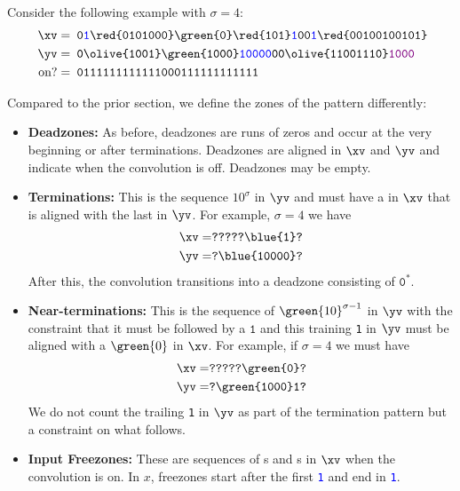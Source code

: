 Consider the following example with $\sigma = 4$:
\begin{align*}
  \xv=&\texttt{ 0\textcolor{blue}{1}\red{0101000}\green{0}\red{101}\textcolor{blue}{1}00\textcolor{blue}{1}\red{00100100101}}\\
  \yv=&\texttt{ 0\olive{1001}\green{1000}\textcolor{blue}{10000}00\olive{11001110}\textcolor{violet}{1000}}\\
  \text{ on?}=&\texttt{ 0111111111111000111111111111}%
\end{align*}

Compared to the prior section, we define the zones of the pattern differently:
\begin{itemize}

  \item \textbf{Deadzones:} As before, deadzones are runs of zeros and occur at the very beginning or after terminations. Deadzones are aligned in $\xv$ and $\yv$ and indicate when the convolution is off. Deadzones may be empty.

  \item \textbf{Terminations:} This is the sequence $10^{\sigma}$ in $\yv$ and must have a  in $\xv$ that is aligned with the last  in $\yv$. For example, $\sigma=4$ we have
    \begin{align*}
      \xv=& \texttt{?????\blue{1}?}\\
      \yv=&\texttt{?\blue{10000}?}
    \end{align*}
    After this, the convolution transitions into a deadzone consisting of $\texttt{0}^*$.

  \item \textbf{Near-terminations:} This is the sequence of $\green{10}^{\sigma-1}$ in $\yv$ with the constraint that it must be followed by a $\texttt{1}$ and this training \texttt{1} in $\yv$ must be aligned with a $\green{0}$ in $\xv$. For example, if $\sigma=4$ we must have
    \begin{align*}
      \xv=& \texttt{?????\green{0}?}\\
      \yv=&\texttt{?\green{1000}1?}
    \end{align*}
    We do not count the trailing \texttt{1} in $\yv$ as part of the termination pattern but a constraint on what follows.

  \item \textbf{Input Freezones:} These are sequences of \texttt{}s and \texttt{}s in $\xv$ when the convolution is on. In $x$, freezones start after the first  \texttt{\textcolor{blue}{1}} and end in \texttt{\textcolor{blue}{1}}.


\end{itemize}
